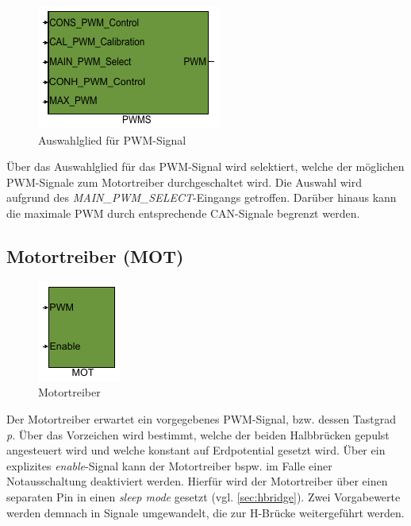 \begin{figure}[H]%
\centering
\includegraphics[width=0.25\columnwidth]{./Bilder/fig_pwm}%
\caption{Auswahlglied für PWM-Signal}%
\label{fig_pwm}%
\end{figure}

Über das Auswahlglied für das PWM-Signal wird selektiert, welche der möglichen PWM-Signale zum Motortreiber durchgeschaltet wird. Die Auswahl wird aufgrund des \textit{MAIN\_PWM\_SELECT}-Eingangs getroffen. Darüber hinaus kann die maximale PWM durch entsprechende CAN-Signale begrenzt werden. 

\subsection{Motortreiber (MOT)} \label{subsec:MOT}

\begin{figure}[H]%
\centering
\includegraphics[width=0.10\columnwidth]{./Bilder/fig_mot}%
\caption{Motortreiber}%
\label{fig_mot}%
\end{figure}

Der Motortreiber erwartet ein vorgegebenes PWM-Signal, bzw. dessen Tastgrad \textit{p}. Über das Vorzeichen wird bestimmt, welche der beiden Halbbrücken gepulst angesteuert wird und welche konstant auf Erdpotential gesetzt wird. Über ein explizites \textit{enable}-Signal kann der Motortreiber bspw. im Falle einer Notausschaltung deaktiviert werden. Hierfür wird der Motortreiber über einen separaten Pin in einen \textit{sleep mode} gesetzt (vgl. \autoref{sec:hbridge}). Zwei Vorgabewerte werden demnach in Signale umgewandelt, die zur H-Brücke weitergeführt werden.



